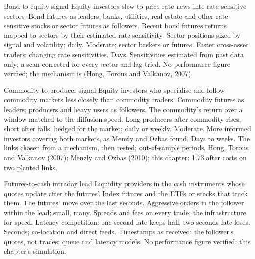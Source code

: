 \begin{strategyfile}{Bond-to-equity signal}\label{strat:s1:cross-asset-lead-lag:bond}
 Equity investors slow to price rate news into rate-sensitive sectors.
 Bond futures as leaders; banks, utilities, real estate and other rate-sensitive stocks or sector futures as followers.
 Recent bond futures returns mapped to sectors by their estimated rate sensitivity.
 Sector positions sized by signal and volatility; daily.
 Moderate; sector baskets or futures.
 Faster cross-asset traders; changing rate sensitivities.
 Days.
 Sensitivities estimated from past data only; a scan corrected for every sector and lag tried.
 No performance figure verified; the mechanism is  (Hong, Torous and Valkanov, 2007).
\end{strategyfile}

\begin{strategyfile}{Commodity-to-producer signal}\label{strat:s1:cross-asset-lead-lag:commodity}
 Equity investors who specialise and follow commodity markets less closely than commodity traders.
 Commodity futures as leaders; producers and heavy users as followers.
 The commodity's return over a window matched to the diffusion speed.
 Long producers after commodity rises, short after falls, hedged for the market; daily or weekly.
 Moderate.
 More informed investors covering both markets, as Menzly and Ozbas found.
 Days to weeks.
 The links chosen from a mechanism, then tested; out-of-sample periods.
 Hong, Torous and Valkanov (2007); Menzly and Ozbas (2010); this chapter: 1.73 after costs on two planted links.
\end{strategyfile}

\begin{strategyfile}{Futures-to-cash intraday lead}\label{strat:s1:cross-asset-lead-lag:futcash}
 Liquidity providers in the cash instruments whose quotes update after the futures'.
 Index futures and the ETFs or stocks that track them.
 The futures' move over the last seconds.
 Aggressive orders in the follower within the lead; small, many.
 Spreads and fees on every trade; the infrastructure for speed.
 Latency competition: one second late keeps half, two seconds late loses.
 Seconds; co-location and direct feeds.
 Timestamps as received; the follower's quotes, not trades; queue and latency models.
 No performance figure verified; this chapter's simulation.
\end{strategyfile}

